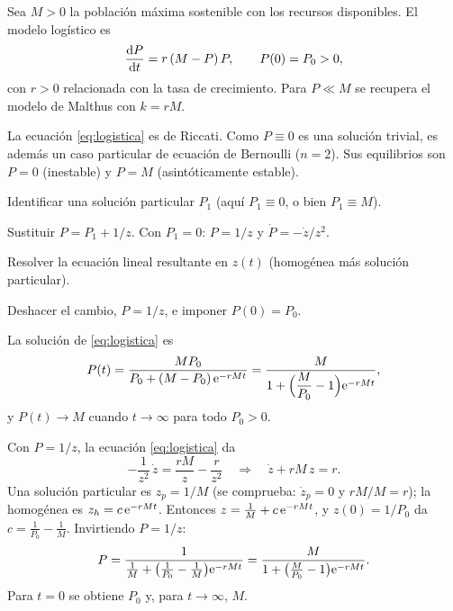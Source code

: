 \documentclass[11pt,twoside]{article}
\begin{document}
\begin{definicion}
Sea $M>0$ la población máxima sostenible con los recursos disponibles. El modelo logístico es
\begin{equation}\label{eq:logistica}
\frac{\mathrm{d}P}{\mathrm{d}t}=r\,(M-P)\,P,\qquad P(0)=P_0>0,
\end{equation}
con $r>0$ relacionada con la tasa de crecimiento. Para $P\ll M$ se recupera el modelo de Malthus con $k=rM$.
\end{definicion}

La ecuación \eqref{eq:logistica} es de Riccati. Como $P\equiv0$ es una solución trivial, es además un caso particular de
ecuación de Bernoulli ($n=2$). Sus equilibrios son $P=0$ (inestable) y $P=M$ (asintóticamente estable).

\begin{algoritmo}
\begin{pasosalg}
\item Identificar una solución particular $P_1$ (aquí $P_1\equiv0$, o bien $P_1\equiv M$).
\item Sustituir $P=P_1+1/z$. Con $P_1=0$: $P=1/z$ y $\dot P=-\dot z/z^2$.
\item Resolver la ecuación lineal resultante en $z(t)$ (homogénea más solución particular).
\item Deshacer el cambio, $P=1/z$, e imponer $P(0)=P_0$.
\end{pasosalg}
\end{algoritmo}

\begin{proposicion}\label{prop:logistica}
La solución de \eqref{eq:logistica} es
\begin{equation}\label{eq:logisticasol}
P(t)=\frac{MP_0}{P_0+(M-P_0)\,\mathrm{e}^{-rMt}}=\frac{M}{1+\Big(\dfrac{M}{P_0}-1\Big)\mathrm{e}^{-rMt}},
\end{equation}
y $P(t)\to M$ cuando $t\to\infty$ para todo $P_0>0$.
\end{proposicion}

\begin{demostracion}
Con $P=1/z$, la ecuación \eqref{eq:logistica} da
\begin{equation*}
-\frac1{z^2}\,\dot z=\frac{rM}{z}-\frac{r}{z^2}\quad\Longrightarrow\quad\dot z+rM\,z=r.
\end{equation*}
Una solución particular es $z_p=1/M$ (se comprueba: $\dot z_p=0$ y $rM/M=r$); la homogénea es $z_h=c\,\mathrm{e}^{-rMt}$.
Entonces $z=\frac1M+c\,\mathrm{e}^{-rMt}$, y $z(0)=1/P_0$ da $c=\frac1{P_0}-\frac1M$. Invirtiendo $P=1/z$:
\begin{equation*}
P=\frac{1}{\frac1M+\big(\frac1{P_0}-\frac1M\big)\mathrm{e}^{-rMt}}=\frac{M}{1+\big(\frac{M}{P_0}-1\big)\mathrm{e}^{-rMt}}.
\end{equation*}
Para $t=0$ se obtiene $P_0$ y, para $t\to\infty$, $M$.
\end{demostracion}
\end{document}
